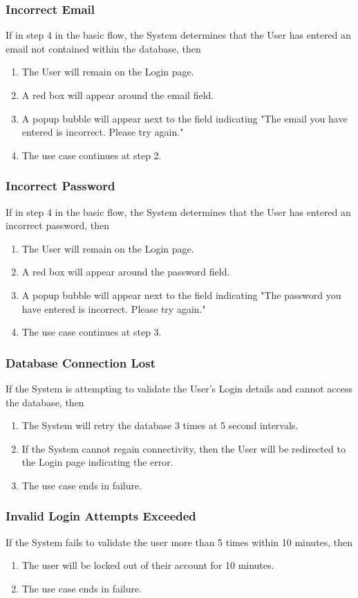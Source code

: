\documentclass[a4paper,11pt]{article}
\begin{document}
\subsubsection{Incorrect Email}
If in step 4 in the basic flow, the System determines that the User has entered an email not contained within the database, then
\begin{enumerate}
\item The User will remain on the Login page.
\item A red box will appear around the email field.
\item A popup bubble will appear next to the field indicating "The email you have entered is incorrect. Please try again."
\item The use case continues at step 2.
\end{enumerate}

\subsubsection{Incorrect Password}
If in step 4 in the basic flow, the System determines that the User has entered an incorrect password, then
\begin{enumerate}
\item The User will remain on the Login page.
\item A red box will appear around the password field.
\item A popup bubble will appear next to the field indicating "The password you have entered is incorrect. Please try again."
\item The use case continues at step 3.
\end{enumerate}

\subsubsection{Database Connection Lost}
If the System is attempting to validate the User's Login details and cannot access the database, then
\begin{enumerate}
\item The System will retry the database 3 times at 5 second intervals.
\item If the System cannot regain connectivity, then the User will be redirected to the Login page indicating the error.
\item The use case ends in failure.
\end{enumerate}

\subsubsection{Invalid Login Attempts Exceeded}
If the System fails to validate the user more than 5 times within 10 minutes, then
\begin{enumerate}
\item The user will be locked out of their account for 10 minutes.
\item The use case ends in failure.
\end{enumerate}
\end{document}
